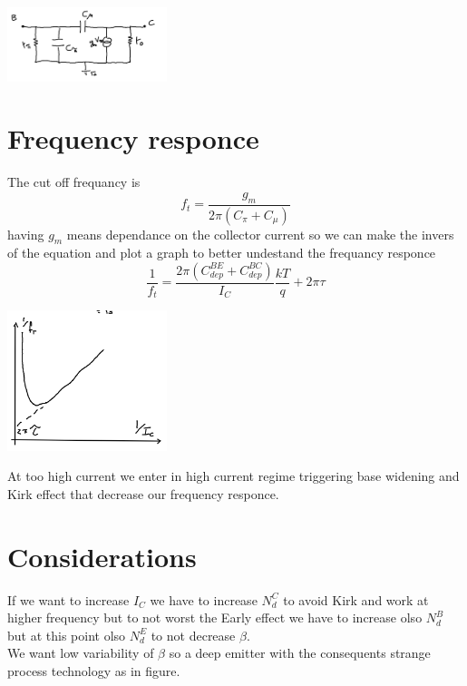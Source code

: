 \centering
\includegraphics[width=0.35\textwidth]{bjt13.png}\\
\raggedright


\section{Frequency responce}

The cut off frequancy is
\begin{equation}
f_t=\frac{g_m}{2\pi(C_\pi+C_\mu)}
\end{equation}
having $g_m$ means dependance on the collector current so we can make the invers of the equation and plot a graph to better undestand the frequancy responce
\begin{equation}
\frac{1}{f_t}=\frac{2\pi(C_{dep}^{BE}+C_{dep}^{BC})}{I_C}\frac{kT}{q}+2\pi\tau
\end{equation}

\centering
\includegraphics[width=0.35\textwidth]{bjt14.png}\\
\raggedright

At too high current we enter in high current regime triggering base widening and Kirk effect that decrease our frequency responce.\\



\section{Considerations}

If we want to increase $I_C$ we have to increase $N_d^C$ to avoid Kirk and work at higher frequency but to not worst the Early effect we have to increase olso $N_d^B$ but at this point olso $N_d^E$ to not decrease $\beta$.\\
\vspace{5mm}
We want low variability of $\beta$ so a deep emitter with the consequents strange process technology as in figure.\\

